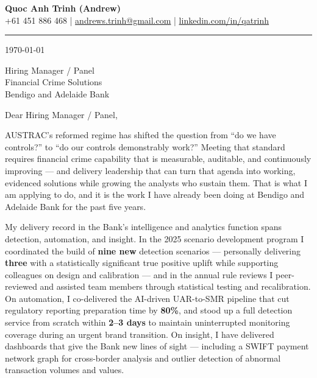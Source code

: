 \documentclass[11pt, a4paper]{article}
\begin{document}
\begin{center}
    {\LARGE \textbf{Quoc Anh Trinh (Andrew)}}\\[4pt]
    {\small
        +61 451 886 468 \quad|\quad
        \href{mailto:andrews.trinh@gmail.com}{andrews.trinh@gmail.com} \quad|\quad
        \href{https://www.linkedin.com/in/qatrinh}{linkedin.com/in/qatrinh}
    }
\end{center}

\vspace{4pt}
\hrule
\vspace{14pt}

\today

\vspace{8pt}

Hiring Manager / Panel\\
Financial Crime Solutions\\
Bendigo and Adelaide Bank

\vspace{10pt}

Dear Hiring Manager / Panel,

AUSTRAC's reformed regime has shifted the question from ``do we have controls?'' to ``do our controls demonstrably work?'' Meeting that standard requires financial crime capability that is measurable, auditable, and continuously improving --- and delivery leadership that can turn that agenda into working, evidenced solutions while growing the analysts who sustain them. That is what I am applying to do, and it is the work I have already been doing at Bendigo and Adelaide Bank for the past five years.

My delivery record in the Bank's intelligence and analytics function spans detection, automation, and insight. In the 2025 scenario development program I coordinated the build of \textbf{nine new} detection scenarios --- personally delivering \textbf{three} with a statistically significant true positive uplift while supporting colleagues on design and calibration --- and in the annual rule reviews I peer-reviewed and assisted team members through statistical testing and recalibration. On automation, I co-delivered the AI-driven UAR-to-SMR pipeline that cut regulatory reporting preparation time by \textbf{80\%}, and stood up a full detection service from scratch within \textbf{2--3 days} to maintain uninterrupted monitoring coverage during an urgent brand transition. On insight, I have delivered dashboards that give the Bank new lines of sight --- including a SWIFT payment network graph for cross-border analysis and outlier detection of abnormal transaction volumes and values.
\end{document}
